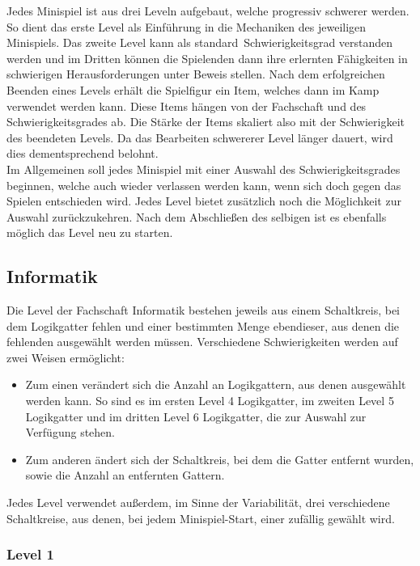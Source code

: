 Jedes Minispiel ist aus drei Leveln aufgebaut, welche progressiv schwerer werden.
So dient das erste Level als Einführung in die Mechaniken des jeweiligen Minispiels.
Das zweite Level kann als \glqq standard\grqq\ Schwierigkeitsgrad verstanden werden und im Dritten können die Spielenden dann ihre erlernten Fähigkeiten in schwierigen Herausforderungen unter Beweis stellen.
Nach dem erfolgreichen Beenden eines Levels erhält die Spielfigur ein Item, welches dann im Kamp verwendet werden kann.
Diese Items hängen von der Fachschaft und des Schwierigkeitsgrades ab.
Die Stärke der Items skaliert also mit der Schwierigkeit des beendeten Levels. 
Da das Bearbeiten schwererer Level länger dauert, wird dies dementsprechend belohnt.\\
Im Allgemeinen soll jedes Minispiel mit einer Auswahl des Schwierigkeitsgrades beginnen, welche auch wieder verlassen werden kann, wenn sich doch gegen das Spielen entschieden wird.
Jedes Level bietet zusätzlich noch die Möglichkeit zur Auswahl zurückzukehren.
Nach dem Abschließen des selbigen ist es ebenfalls möglich das Level neu zu starten.


\subsection{Informatik}

Die Level der Fachschaft Informatik bestehen jeweils aus einem Schaltkreis, bei dem Logikgatter fehlen und einer bestimmten Menge ebendieser, aus denen die fehlenden ausgewählt werden müssen.
Verschiedene Schwierigkeiten werden auf zwei Weisen ermöglicht:

\begin{itemize}
    \item[] Zum einen verändert sich die Anzahl an Logikgattern, aus denen ausgewählt werden kann.
            So sind es im ersten Level 4 Logikgatter, im zweiten Level 5 Logikgatter und im dritten Level 6 Logikgatter, die zur Auswahl zur Verfügung stehen.
    \item[] Zum anderen ändert sich der Schaltkreis, bei dem die Gatter entfernt wurden, sowie die Anzahl an entfernten Gattern.
\end{itemize}

Jedes Level verwendet außerdem, im Sinne der Variabilität, drei verschiedene Schaltkreise, aus denen, bei jedem Minispiel-Start, einer zufällig gewählt wird.

\subsubsection{Level 1}

